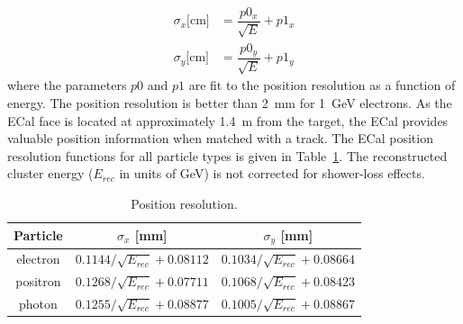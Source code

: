 \begin{equation}
\label{eq:posnRes}
\begin{split}
\sigma_x \textrm{[cm]}& =  \dfrac{p0_x}{\sqrt{E}}+p1_x\\
\sigma_y \textrm{[cm]}& =  \dfrac{p0_y}{\sqrt{E}}+p1_y
\end{split}
\end{equation}
where the parameters $p0$ and $p1$ are fit to the position resolution as a function of energy. The position resolution is better than 2~mm for 1~GeV electrons. As the ECal face is located at  approximately 1.4~m from the target, the ECal provides valuable position information when matched with a track. The ECal position resolution functions for all particle types is given in Table~\ref{tab:PosnResTable}. The reconstructed cluster energy ($E_{rec}$ in units of GeV) is not corrected for shower-loss effects. 

\begin{table}[htb]
\caption{Position resolution.}
\label{tab:PosnResTable}
\centering
\begin{tabular}{|c|c|c|}
\toprule
Particle & $\sigma_x$ [mm] & $\sigma_y$ [mm] \\
\midrule
electron & $0.1144/\sqrt{E_{rec}}+0.08112$ & $0.1034/\sqrt{E_{rec}}+0.08664$ \\
positron & $0.1268/\sqrt{E_{rec}}+0.07711$ & $0.1068/\sqrt{E_{rec}}+0.08423$ \\
photon & $0.1255/\sqrt{E_{rec}}+0.08877$ & $0.1005/\sqrt{E_{rec}}+0.08867$ \\
\bottomrule
\end{tabular}
\end{table}
